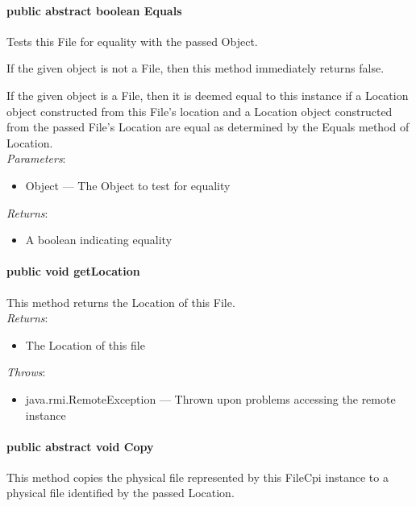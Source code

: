 \documentclass[$Date: 2003/06/26 19:29:31 $]{glabarticle}
\begin{document}
\paragraph{public abstract boolean Equals}

Tests this File for equality with the passed Object.

 If the given object is not a File, then this method immediately
 returns false.
 
 If the given object is a File, then it is deemed equal to this
 instance if a Location object constructed from this File's location
 and a Location object constructed from the passed File's Location are
 equal as determined by the Equals method of Location. \\

 \textit{Parameters}:
 \begin{itemize}
 \item[] Object --- The Object to test for equality 
 \end{itemize}
 
 \textit{Returns}:
\begin{itemize}
\item[] A boolean indicating equality
\end{itemize}

\paragraph{public void getLocation}

 This method returns the Location of this File. \\

 \textit{Returns}:
 \begin{itemize}
 \item[] The Location of this file
 \end{itemize}
 
 \textit{Throws}:
 \begin{itemize}
 \item[] java.rmi.RemoteException --- Thrown upon problems accessing the remote instance 
 \end{itemize}
 
\paragraph{public abstract void Copy}

This method copies the physical file represented by this FileCpi instance
to a physical file identified by the passed Location. \\
\end{document}
